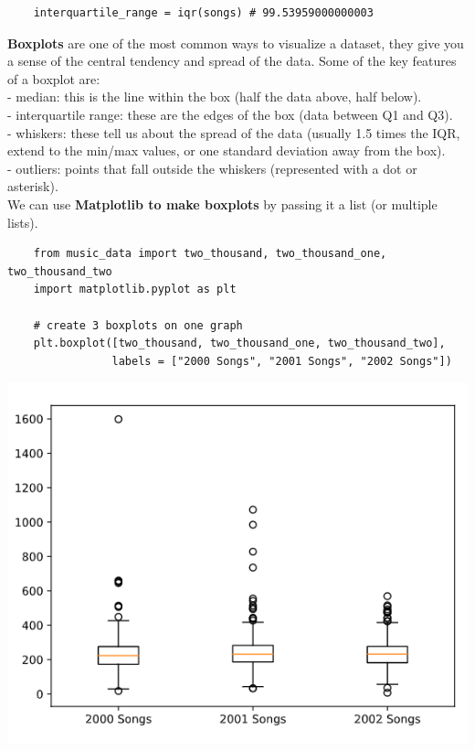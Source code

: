 \documentclass[11pt, a4paper]{article}
\begin{document}
\begin{spacing}{1.1}
\begin{lstlisting}
	interquartile_range = iqr(songs) # 99.53959000000003 \end{lstlisting}\vspace*{4mm}
	\textbf{Boxplots} are one of the most common ways to visualize a dataset, they give you a sense of the central tendency and spread of the data. Some of the key features of a boxplot are: \\
	\hspace*{3mm} - median: this is the line within the box (half the data above, half below). \\
	\hspace*{3mm} - interquartile range: these are the edges of the box (data between Q1 and Q3). \\
	\hspace*{3mm} - whiskers: these tell us about the spread of the data (usually 1.5 times the IQR, extend to the \hspace*{24mm} min/max values, or one standard deviation away from the box). \\
	\hspace*{3mm} - outliers: points that fall outside the whiskers (represented with a dot or asterisk). \vspace*{1mm} \\
	We can use \textbf{Matplotlib to make boxplots} by passing it a list (or multiple lists). 
	\begin{lstlisting}
	from music_data import two_thousand, two_thousand_one, two_thousand_two
	import matplotlib.pyplot as plt
	
	# create 3 boxplots on one graph
	plt.boxplot([two_thousand, two_thousand_one, two_thousand_two], 
	            labels = ["2000 Songs", "2001 Songs", "2002 Songs"]) \end{lstlisting}\vspace*{1mm}
	\includegraphics[scale=.4]{bpquart} \newpage


\end{spacing}
\end{document}
